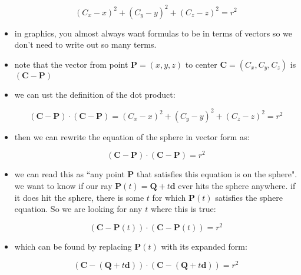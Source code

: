 \begin{itemize}
        \begin{equation}
            (C_{x} - x)^{2}+(C_{y} - y)^{2}+(C_{z} - z)^{2} = r^{2}
        \end{equation}

    \item in graphics, you almost always want formulas to be in terms of
        vectors so we don't need to write out so many terms.
    \item note that the vector from point $\mathbf{P}=(x,y,z)$ to center
        $\mathbf{C}=(C_{x},C_{y},C_{z})$ is $(\mathbf{C}-\mathbf{P})$
    \item we can ust the definition of the dot product:

        \begin{equation}
            (\mathbf{C}-\mathbf{P}) \cdot (\mathbf{C}-\mathbf{P}) = (C_{x} - x)^{2}+(C_{y} - y)^{2}+(C_{z} - z)^{2} = r^{2}
        \end{equation}

    \item then we can rewrite the equation of the sphere in vector form as:

        \begin{equation}
            (\mathbf{C}-\mathbf{P}) \cdot (\mathbf{C}-\mathbf{P}) = r^{2}
        \end{equation}

    \item we can read this as ``any point $\mathbf{P}$ that satisfies this
        equation is on the sphere". we want to know if our ray 
        $\mathbf{P}(t)=\mathbf{Q}+t\mathbf{d}$ ever hits the sphere anywhere. if
        it does hit the sphere, there is some $t$ for which $\mathbf{P}(t)$
        satisfies the sphere equation. So we are looking for any $t$ where this
        is true:

        \begin{equation}
            (\mathbf{C}-\mathbf{P}(t)) \cdot (\mathbf{C}-\mathbf{P}(t)) = r^{2}
        \end{equation}

    \item which can be found by replacing $\mathbf{P}(t)$ with its expanded
        form:

        \begin{equation}
            (\mathbf{C}-(\mathbf{Q}+t\mathbf{d})) \cdot
            (\mathbf{C}-(\mathbf{Q}+t\mathbf{d})) = r^{2}
        \end{equation}

\end{itemize}
